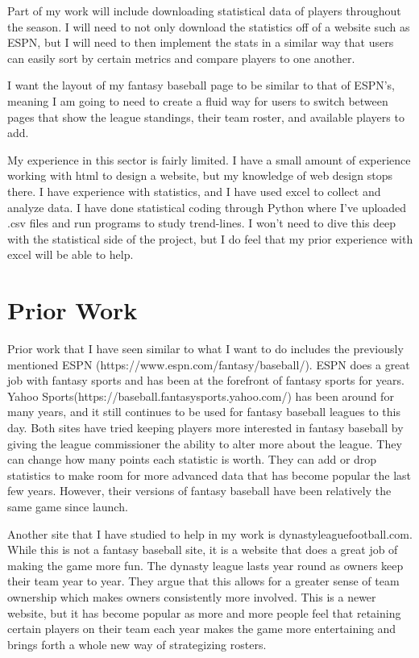 \documentclass[10pt,twocolumn]{article}
\begin{document}
Part of my work will include downloading statistical data of players throughout the season. I will need to not only download the statistics off of a website such as ESPN, but I will need to then implement the stats in a similar way that users can easily sort by certain metrics and compare players to one another. 

I want the layout of my fantasy baseball page to be similar to that of ESPN’s, meaning I am going to need to create a fluid way for users to switch between pages that show the league standings, their team roster, and available players to add. 

My experience in this sector is fairly limited. I have a small amount of experience working with html to design a website, but my knowledge of web design stops there. I have experience with statistics, and I have used excel to collect and analyze data. I have done statistical coding through Python where I’ve uploaded .csv files and run programs to study trend-lines. I won’t need to dive this deep with the statistical side of the project, but I do feel that my prior experience with excel will be able to help.

\section{Prior Work}

Prior work that I have seen similar to what I want to do includes the previously mentioned ESPN (https://www.espn.com/fantasy/baseball/). ESPN does a great job with fantasy sports and has been at the forefront of fantasy sports for years. Yahoo Sports(https://baseball.fantasysports.yahoo.com/)  has been around for many years, and it still continues to be used for fantasy baseball leagues to this day. Both sites have tried keeping players more interested in fantasy baseball by giving the league commissioner the ability to alter more about the league. They can change how many points each statistic is worth. They can add or drop statistics to make room for more advanced data that has become popular the last few years. However, their versions of fantasy baseball have been relatively the same game since launch. 

Another site that I have studied to help in my work is dynastyleaguefootball.com. While this is not a fantasy baseball site, it is a website that does a great job of making the game more fun. The dynasty league lasts year round as owners keep their team year to year. They argue that this allows for a greater sense of team ownership which makes owners consistently more involved. This is a newer website, but it has become popular as more and more people feel that retaining certain players on their team each year makes the game more entertaining and brings forth a whole new way of strategizing rosters. 
\end{document}
